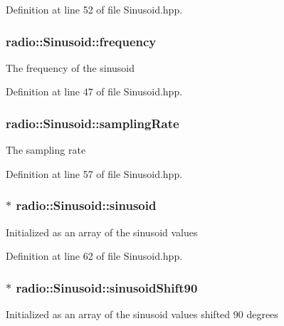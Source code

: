 Definition at line 52 of file Sinusoid.\+hpp.

\hypertarget{classradio_1_1Sinusoid_ad429b5dd330e96aaf89a0d48ef59d3f2}{
\subsubsection[{frequency}]{ radio\+::\+Sinusoid\+::frequency\hspace{0.3cm}{\ttfamily [protected]}}}\label{classradio_1_1Sinusoid_ad429b5dd330e96aaf89a0d48ef59d3f2}
The frequency of the sinusoid 

Definition at line 47 of file Sinusoid.\+hpp.

\hypertarget{classradio_1_1Sinusoid_a964d64aae9acc4ea5d752534a33d76b8}{
\subsubsection[{sampling\+Rate}]{ radio\+::\+Sinusoid\+::sampling\+Rate\hspace{0.3cm}{\ttfamily [protected]}}}\label{classradio_1_1Sinusoid_a964d64aae9acc4ea5d752534a33d76b8}
The sampling rate 

Definition at line 57 of file Sinusoid.\+hpp.

\hypertarget{classradio_1_1Sinusoid_a56556c3d3e08d1c9481c18e087ff1c85}{
\subsubsection[{sinusoid}]{$\ast$ radio\+::\+Sinusoid\+::sinusoid\hspace{0.3cm}{\ttfamily [protected]}}}\label{classradio_1_1Sinusoid_a56556c3d3e08d1c9481c18e087ff1c85}
Initialized as an array of the sinusoid values 

Definition at line 62 of file Sinusoid.\+hpp.

\hypertarget{classradio_1_1Sinusoid_a556db1dca1d5af3d9c6ba2d51f9e3cf8}{
\subsubsection[{sinusoid\+Shift90}]{$\ast$ radio\+::\+Sinusoid\+::sinusoid\+Shift90\hspace{0.3cm}{\ttfamily [protected]}}}\label{classradio_1_1Sinusoid_a556db1dca1d5af3d9c6ba2d51f9e3cf8}
Initialized as an array of the sinusoid values shifted 90 degrees 

